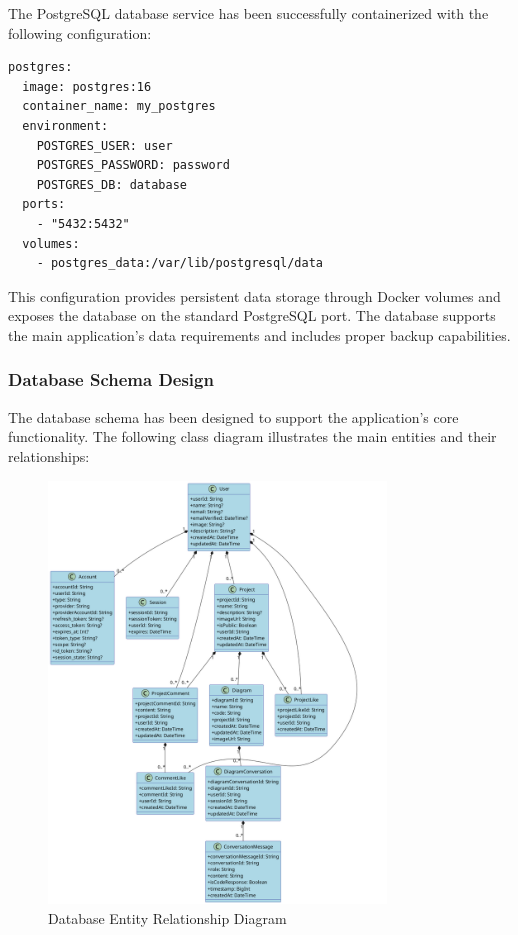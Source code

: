 The PostgreSQL database service has been successfully containerized with the following configuration:

\begin{verbatim}
postgres:
  image: postgres:16
  container_name: my_postgres
  environment:
    POSTGRES_USER: user
    POSTGRES_PASSWORD: password
    POSTGRES_DB: database
  ports:
    - "5432:5432"
  volumes:
    - postgres_data:/var/lib/postgresql/data
\end{verbatim}

This configuration provides persistent data storage through Docker volumes and exposes the database on the standard PostgreSQL port. The database supports the main application's data requirements and includes proper backup capabilities.

\subsubsection{Database Schema Design}

The database schema has been designed to support the application's core functionality. The following class diagram illustrates the main entities and their relationships:

\begin{figure}[H]
  \centering
  \includegraphics[width=0.8\textwidth]{conception/SprintI/global_class_diagram.png}
  \caption{Database Entity Relationship Diagram}
  \label{fig:database_schema}
\end{figure}


